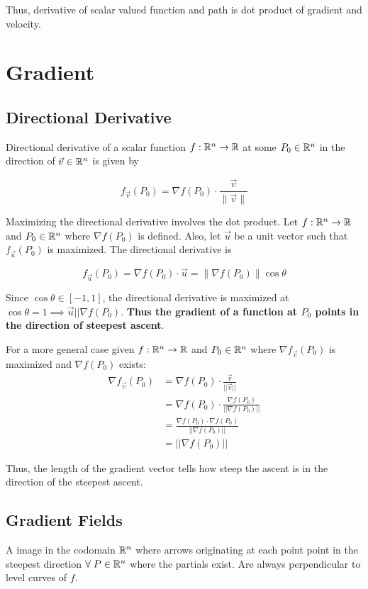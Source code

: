 Thus, derivative of scalar valued function and path is dot product of gradient and velocity.

\section{Gradient}

\subsection{Directional Derivative}

Directional derivative of a scalar function $f:\mathbb{R}^n\to \mathbb{R}$ at some $P_0\in\mathbb{R}^n$ in the direction of $\vec{v}\in\mathbb{R}^n$ is given by

\[\boxed{f_{\vec{v}}\left(P_{0}\right)=\nabla f\left(P_{0}\right) \cdot \frac{\vec{v}}{\|\vec{v}\|}}\]

Maximizing the directional derivative involves the dot product. Let $f:\mathbb{R}^n\to \mathbb{R}$ and $P_0\in\mathbb{R}^n$ where $\nabla f(P_0)$ is defined.
Also, let $\vec{u}$ be a unit vector such that $f_{\vec{u}}(P_0)$ is maximized. The directional derivative is

\[f_{\vec u}(P_0)=\nabla f(P_0)\cdot \vec u=\|\nabla f(P_0)\|\cos \theta\]

Since $\cos\theta \in [-1,1]$, the directional derivative is maximized at $\cos\theta = 1\implies \vec{u}||\nabla f(P_0)$.
\textbf{Thus the gradient of a function at $P_0$ points in the direction of steepest ascent}.

For a more general case given $f:\mathbb{R}^n\to \mathbb{R}$ and $P_0\in\mathbb{R}^n$ where $\nabla f_{\vec{v}}(P_0)$ is maximized and $\nabla f(P_0)$ exists:
\begin{align*}
    \nabla f_{\vec{v}}(P_0)&=\nabla f(P_0) \cdot \frac{\vec{v}}{||\vec{v}||}\\
    &=\nabla f(P_0) \cdot \frac{\nabla f(P_0)}{||\nabla f(P_0)||}\\
    &=\frac{\nabla f(P_0)\cdot \nabla f(P_0)}{||\nabla f(P_0)||}\\
    &=||\nabla f(P_0)||
\end{align*}

Thus, the length of the gradient vector tells how steep the ascent is in the direction of the steepest ascent.

\subsection{Gradient Fields}

A image in the codomain $\mathbb{R}^n$ where arrows originating at each point point in the steepest direction $\forall\; P\in \mathbb{R}^n$ where the partials exist.
Are always perpendicular to level curves of $f$.

